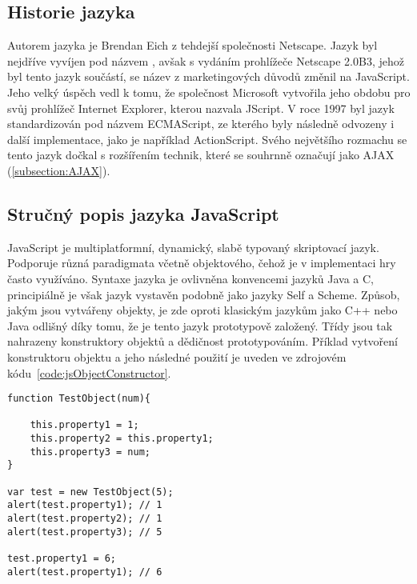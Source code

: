\subsection*{Historie jazyka}
\label{subsection:jsHistorie}
Autorem jazyka je Brendan Eich z tehdejší společnosti Netscape. Jazyk byl nejdříve vyvíjen pod názvem \textit{}, avšak s vydáním prohlížeče Netscape 2.0B3, jehož byl tento jazyk součástí, se název z marketingových důvodů změnil na JavaScript. Jeho velký úspěch vedl k tomu, že společnost Microsoft vytvořila jeho obdobu pro svůj prohlížeč Internet Explorer, kterou nazvala JScript. V roce 1997 byl jazyk standardizován pod názvem ECMAScript, ze kterého byly následně odvozeny i další implementace, jako je například ActionScript. Svého největšího rozmachu se tento jazyk dočkal s rozšířením technik, které se souhrnně označují jako AJAX (\ref{subsection:AJAX}).\cite{flanagan2006javascript}

\subsection*{Stručný popis jazyka JavaScript}
\label{subsection:jsPopis}
JavaScript je multiplatformní, dynamický, slabě typovaný skriptovací jazyk. Podporuje různá paradigmata včetně objektového, čehož je v implementaci hry často využíváno. Syntaxe jazyka je ovlivněna konvencemi jazyků Java a C, principiálně je však jazyk vystavěn podobně jako jazyky Self a Scheme. Způsob, jakým jsou vytvářeny objekty, je zde oproti klasickým jazykům jako C++ nebo Java odlišný díky tomu, že je tento jazyk prototypově založený. Třídy jsou tak nahrazeny konstruktory objektů a dědičnost prototypováním.\cite{flanagan2006javascript} Příklad vytvoření konstruktoru objektu a jeho následné použití je uveden ve zdrojovém kódu~\ref{code:jsObjectConstructor}.
\begin{lstlisting}[caption=Příklad vytvoření objektu v JavaScriptu,label=code:jsObjectConstructor]
function TestObject(num){

    this.property1 = 1;
    this.property2 = this.property1;
    this.property3 = num;
}

var test = new TestObject(5);
alert(test.property1); // 1
alert(test.property2); // 1
alert(test.property3); // 5

test.property1 = 6;
alert(test.property1); // 6
\end{lstlisting}

